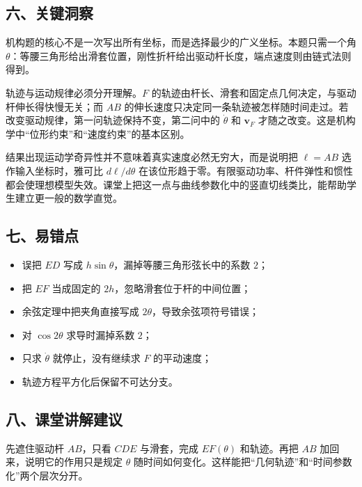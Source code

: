 \documentclass[12pt,a4paper,UTF8]{ctexart}
\newcommand{\tightlist}{\setlength{\itemsep}{0pt}\setlength{\parskip}{0pt}}
\begin{document}
\subsection{六、关键洞察}\label{ux516dux5173ux952eux6d1eux5bdf-4}

机构题的核心不是一次写出所有坐标，而是选择最少的广义坐标。本题只需一个角
\(\theta\)：等腰三角形给出滑套位置，刚性折杆给出驱动杆长度，端点速度则由链式法则得到。

轨迹与运动规律必须分开理解。\(F\)
的轨迹由杆长、滑套和固定点几何决定，与驱动杆伸长得快慢无关；而 \(AB\)
的伸长速度只决定同一条轨迹被怎样随时间走过。若改变驱动规律，第一问轨迹保持不变，第二问中的
\(\dot\theta\) 和 \(\bm v_F\)
才随之改变。这是机构学中``位形约束''和``速度约束''的基本区别。

结果出现运动学奇异性并不意味着真实速度必然无穷大，而是说明把 \(\ell=AB\)
选作输入坐标时，雅可比 \(d\ell/d\theta\)
在该位形趋于零。有限驱动功率、杆件弹性和惯性都会使理想模型失效。课堂上把这一点与曲线参数化中的竖直切线类比，能帮助学生建立更一般的数学直觉。

\subsection{七、易错点}\label{ux4e03ux6613ux9519ux70b9-4}

\begin{itemize}
\tightlist
\item
  误把 \(ED\) 写成 \(h\sin\theta\)，漏掉等腰三角形弦长中的系数 \(2\)；
\item
  把 \(EF\) 当成固定的 \(2h\)，忽略滑套位于杆的中间位置；
\item
  余弦定理中把夹角直接写成 \(2\theta\)，导致余弦项符号错误；
\item
  对 \(\cos2\theta\) 求导时漏掉系数 \(2\)；
\item
  只求 \(\dot\theta\) 就停止，没有继续求 \(F\) 的平动速度；
\item
  轨迹方程平方化后保留不可达分支。
\end{itemize}

\subsection{八、课堂讲解建议}\label{ux516bux8bfeux5802ux8bb2ux89e3ux5efaux8bae-4}

先遮住驱动杆 \(AB\)，只看 \(CDE\) 与滑套，完成 \(EF(\theta)\)
和轨迹。再把 \(AB\) 加回来，说明它的作用只是规定 \(\theta\)
随时间如何变化。这样能把``几何轨迹''和``时间参数化''两个层次分开。
\end{document}
